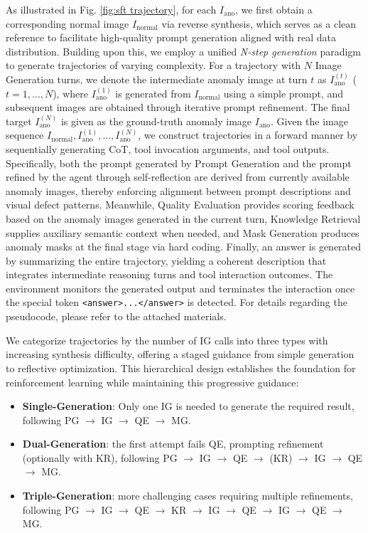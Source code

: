 \documentclass[sigconf]{acmart}
\begin{document}
As illustrated in Fig. \ref{fig:sft trajectory}, for each $I_{\text{ano}}$, we first obtain a corresponding normal image $I_{\text{normal}}$ via reverse synthesis, which serves as a clean reference to facilitate high-quality prompt generation aligned with real data distribution. Building upon this, we employ a unified \emph{N-step generation} paradigm to generate trajectories of varying complexity. For a trajectory with $N$ Image Generation turns, we denote the intermediate anomaly image at turn $t$ as $I_{\text{ano}}^{(t)}$ ($t = 1, \dots, N$), where $I_{\text{ano}}^{(1)}$ is generated from $I_{\text{normal}}$ using a simple prompt, and subsequent images are obtained through iterative prompt refinement. The final target $I_{\text{ano}}^{(N)}$ is given as the ground-truth anomaly image $I_{\text{ano}}$. Given the image sequence ${I_{\text{normal}}, I_{\text{ano}}^{(1)}, \dots, I_{\text{ano}}^{(N)}}$, we construct trajectories in a forward manner by sequentially generating CoT, tool invocation arguments, and tool outputs. Specifically, both the prompt generated by Prompt Generation and the prompt refined by the agent through self-reflection are derived from currently available anomaly images, thereby enforcing alignment between prompt descriptions and visual defect patterns. Meanwhile, Quality Evaluation provides scoring feedback based on the anomaly images generated in the current turn, Knowledge Retrieval supplies auxiliary semantic context when needed, and Mask Generation produces anomaly masks at the final stage via hard coding. Finally, an answer is generated by summarizing the entire trajectory, yielding a coherent description that integrates intermediate reasoning turns and tool interaction outcomes. The environment monitors the generated output and terminates the interaction once the special token \texttt{<answer>...</answer>} is detected. For details regarding the pseudocode, please refer to the attached materials.

We categorize trajectories by the number of IG calls into three types with increasing synthesis difficulty, offering a staged guidance from simple generation to reflective optimization. This hierarchical design establishes the foundation for reinforcement learning while maintaining this progressive guidance:


\begin{itemize}
    \item \textbf{Single-Generation}: Only one IG is needed to generate the required result, following PG $\rightarrow$ IG $\rightarrow$ QE $\rightarrow$ MG.
    \item \textbf{Dual-Generation}: the first attempt fails QE, prompting refinement (optionally with KR), following PG $\rightarrow$ IG $\rightarrow$ QE $\rightarrow$ (KR) $\rightarrow$ IG $\rightarrow$ QE $\rightarrow$ MG.
    \item \textbf{Triple-Generation}: more challenging cases requiring multiple refinements, following PG $\rightarrow$ IG $\rightarrow$ QE $\rightarrow$ KR $\rightarrow$ IG $\rightarrow$ QE $\rightarrow$ IG $\rightarrow$ QE $\rightarrow$ MG.
\end{itemize}
\end{document}

